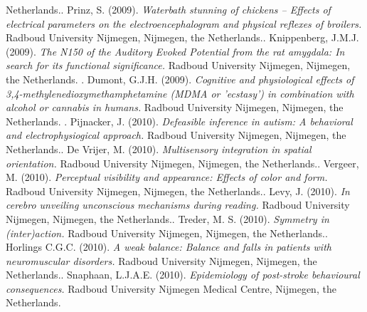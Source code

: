 Netherlands.\npar {}.	Prinz, S. (2009). \emph{Waterbath stunning of chickens – Effects of electrical parameters on the electroencephalogram and physical reflexes of broilers.} Radboud University Nijmegen, Nijmegen, the Netherlands.\npar {}.	Knippenberg, J.M.J. (2009). \emph{The N150 of the Auditory Evoked Potential from the rat amygdala: In search for its functional significance.} Radboud University Nijmegen, Nijmegen, the Netherlands. \npar {}.	Dumont, G.J.H. (2009). \emph{Cognitive and physiological effects of 3,4-methylenedioxymethamphetamine (MDMA or 'ecstasy') in combination with alcohol or cannabis in humans.} Radboud University Nijmegen, Nijmegen, the Netherlands. \npar {}.	Pijnacker, J. (2010). \emph{Defeasible inference in autism: A behavioral and electrophysiogical approach.} Radboud University Nijmegen, Nijmegen, the Netherlands.\npar {}.	De Vrijer, M. (2010). \emph{Multisensory integration in spatial orientation.} Radboud University Nijmegen, Nijmegen, the Netherlands.\npar {}.	Vergeer, M. (2010). \emph{Perceptual visibility and appearance: Effects of color and form.} Radboud University Nijmegen, Nijmegen, the Netherlands.\npar {}.	Levy, J. (2010). \emph{In cerebro unveiling unconscious mechanisms during reading.} Radboud University Nijmegen, Nijmegen, the Netherlands.\npar {}.	Treder, M. S. (2010). \emph{Symmetry in (inter)action.} Radboud University Nijmegen, Nijmegen, the Netherlands.\npar {}.	Horlings C.G.C. (2010). \emph{A weak balance: Balance and falls in patients with neuromuscular disorders.} Radboud University Nijmegen, Nijmegen, the Netherlands.\npar {}.	Snaphaan, L.J.A.E. (2010). \emph{Epidemiology of post-stroke behavioural consequences.} Radboud University Nijmegen Medical Centre, Nijmegen, the Netherlands.  \npar \noindent 
